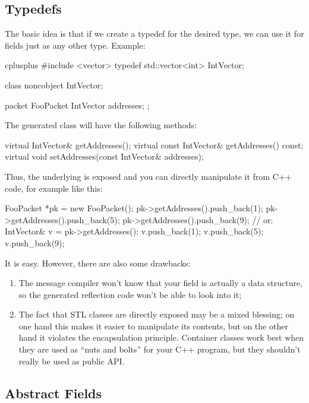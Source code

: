 \subsection{Typedefs}
\label{sec:msg-def:typedefs}

The basic idea is that if we create a typedef for the desired type,
we can use it for fields just as any other type. Example:

\begin{msg}
cplusplus {{
#include <vector>
typedef std::vector<int> IntVector;
}}

class noncobject IntVector;

packet FooPacket {
    IntVector addresses;
};
\end{msg}

The generated class will have the following methods:

\begin{cpp}
virtual IntVector& getAddresses();
virtual const IntVector& getAddresses() const;
virtual void setAddresses(const IntVector& addresses);
\end{cpp}

Thus, the underlying  is exposed and you can directly
manipulate it from C++ code, for example like this:

\begin{cpp}
FooPacket *pk = new FooPacket();
pk->getAddresses().push_back(1);
pk->getAddresses().push_back(5);
pk->getAddresses().push_back(9);
// or:
IntVector& v = pk->getAddresses();
v.push_back(1);
v.push_back(5);
v.push_back(9);
\end{cpp}

It is easy. However, there are also some drawbacks:

\begin{enumerate}
  \item The message compiler won't know that your field is actually
      a data structure, so the generated reflection code won't be able
      to look into it;
  \item The fact that STL classes are directly exposed may be a mixed
      blessing; on one hand this makes it easier to manipulate its
      contents, but on the other hand it violates the encapsulation
      principle. Container classes work best when they are used as
      ``nuts and bolts'' for your C++ program, but they shouldn't really
      be used as public API.
\end{enumerate}

\subsection{Abstract Fields}
\label{sec:msg-def:abstract-fields}

